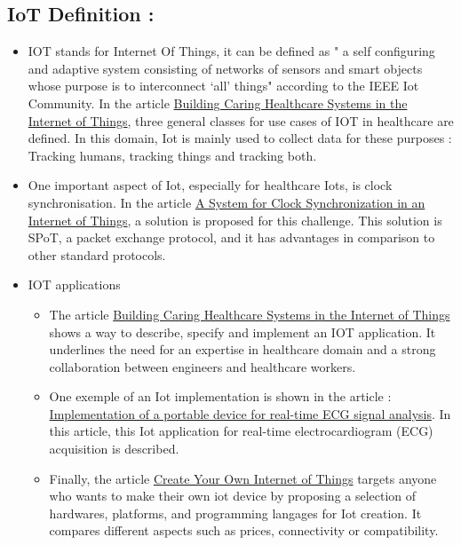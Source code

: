 \subsection{IoT Definition : }
  \begin{itemize}
  
      \item IOT stands for Internet Of Things, it can be defined as " a self configuring and adaptive system consisting of networks of sensors and smart objects whose purpose is to interconnect ‘all’ things" according to the IEEE Iot Community. In the article \uline{Building Caring Healthcare Systems in the Internet of Things}, three general classes for use cases of IOT in healthcare are defined. In this domain, Iot is mainly used to collect data for these purposes : Tracking humans, tracking things and tracking both.

      \item One important aspect of Iot, especially for healthcare Iots, is clock synchronisation. In the article \uline{A System for Clock Synchronization in an Internet of Things}, a solution is proposed for this challenge. This solution is SPoT, a packet exchange protocol, and it has advantages in comparison to other standard protocols.

      \item IOT applications\newline
      \begin{itemize}
        \item The article \uline{Building Caring Healthcare Systems
        in the Internet of Things} shows a way to describe, specify and implement an IOT application. It underlines the need for an expertise in healthcare domain and         a strong collaboration between engineers and healthcare workers.
        \item One exemple of an Iot implementation is shown in the article : \uline{Implementation of a portable device for real-time ECG signal analysis}. In this             article, this Iot application for real-time
        electrocardiogram (ECG) acquisition is described.
        \item Finally, the article \uline{Create Your Own Internet of Things} targets anyone who wants to make their own iot device by proposing a selection of           hardwares, platforms, and programming langages for Iot creation. It compares different aspects such as prices, connectivity or compatibility.
      \end{itemize}
  \end{itemize}

